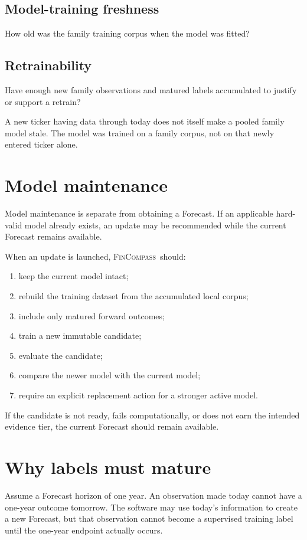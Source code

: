 \documentclass[11pt]{article}
\newcommand{\FC}{\textsc{FinCompass}}
\begin{document}
\subsection{Model-training freshness}
How old was the family training corpus when the model was fitted?

\subsection{Retrainability}
Have enough new family observations and matured labels accumulated to justify or support a retrain?

A new ticker having data through today does not itself make a pooled family model stale. The model was trained on a family corpus, not on that newly entered ticker alone.

\section{Model maintenance}
Model maintenance is separate from obtaining a Forecast. If an applicable hard-valid model already exists, an update may be recommended while the current Forecast remains available.

When an update is launched, \FC\ should:
\begin{enumerate}[itemsep=0.2em]
\item keep the current model intact;
\item rebuild the training dataset from the accumulated local corpus;
\item include only matured forward outcomes;
\item train a new immutable candidate;
\item evaluate the candidate;
\item compare the newer model with the current model;
\item require an explicit replacement action for a stronger active model.
\end{enumerate}

If the candidate is not ready, fails computationally, or does not earn the intended evidence tier, the current Forecast should remain available.

\section{Why labels must mature}
Assume a Forecast horizon of one year. An observation made today cannot have a one-year outcome tomorrow. The software may use today's information to create a new Forecast, but that observation cannot become a supervised training label until the one-year endpoint actually occurs.
\end{document}

